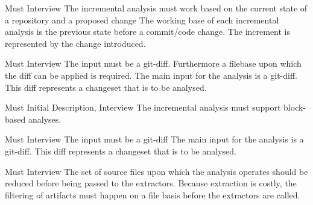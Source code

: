 \documentclass[a4paper]{article}
\begin{document}
\begin{req}
	\reqtable
	{Must}  {Interview}
	{The incremental analysis must work based on the current state of a repository and a proposed change}
	{The working base of each incremental analysis is the previous state before a commit/code change. The increment is represented by the change introduced.}
	
	\begin{subreq} \label{req:git-diff}
		\reqtable
		{Must}  {Interview}
		{The input must be a git-diff. Furthermore a filebase upon which the diff can be applied is required.}
		{The main input for the analysis is a git-diff. This diff represents a changeset that is to be analysed.}
	\end{subreq}
\end{req}

\begin{req}
	\reqtable
	{Must}  {Initial Description, Interview}
	{The incremental analysis must support block-based analyses.}
	{}
	
	\begin{subreq} \label{req:git-diff}
		\reqtable
		{Must}  {Interview}
		{The input must be a git-diff}
		{The main input for the analysis is a git-diff. This diff represents a changeset that is to be analysed.}
	\end{subreq}
\end{req}


\begin{req} \label{req:early-filtering}
\reqtable
	{Must}  {Interview}
	{The set of source files upon which the analysis operates should be reduced before being passed to the extractors.}
	{Because extraction is costly, the filtering of artifacts must happen on a file basis before the extractors are called.}
\end{req}
\end{document}
